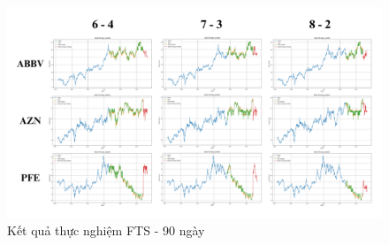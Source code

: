 \documentclass[conference]{IEEEtran}
\begin{document}
\begin{figure}[H]
    \centering
    \begin{minipage}{0.5\textwidth}
    \centering
    \includegraphics[width=1\textwidth]{Image/FTS90.png}
    \caption{Kết quả thực nghiệm FTS - 90 ngày}
    \label{fig:1}
    \end{minipage}
\end{figure}
\end{document}
